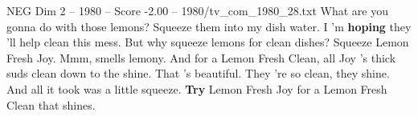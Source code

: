 \begin{textsample}{NEG Dim 2 – 1980 – Score -2.00 – 1980/tv\_com\_1980\_28.txt}  \label{ex:f2_neg_025}
What are you gonna do with those lemons?
Squeeze them into my dish water.
I 'm \textbf{hoping} they 'll help clean this mess.
But why squeeze lemons for clean dishes?
Squeeze Lemon Fresh Joy.
Mmm, smells lemony.
And for a Lemon Fresh Clean, all Joy 's thick suds clean down to the shine.
That 's beautiful.
They 're so clean, they shine.
And all it took was a little squeeze. \textbf{Try} Lemon Fresh Joy for a Lemon Fresh Clean that shines.

\end{textsample}
